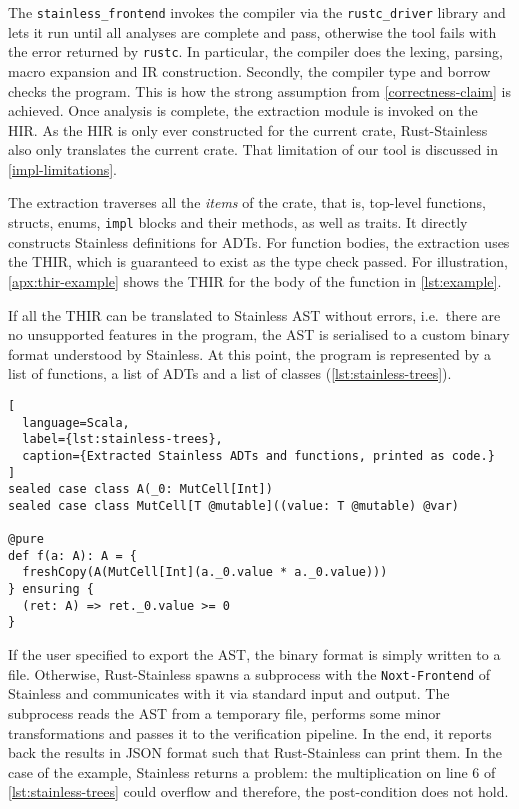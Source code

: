 The \lstinline!stainless_frontend! invokes the compiler via the
\lstinline!rustc_driver! library and lets it run until all analyses are complete
and pass, otherwise the tool fails with the error returned by \lstinline!rustc!.
In particular, the compiler does the lexing, parsing, macro expansion and IR
construction. Secondly, the compiler type and borrow checks the program. This is
how the strong assumption from \autoref{correctness-claim} is achieved. Once
analysis is complete, the extraction module is invoked on the HIR. As the HIR is
only ever constructed for the current crate, Rust-Stainless also only translates
the current crate. That limitation of our tool is discussed in
\autoref{impl-limitations}.

The extraction traverses all the \emph{items} of the crate, that is, top-level
functions, structs, enums, \lstinline!impl! blocks and their methods, as well as
traits. It directly constructs Stainless definitions for ADTs. For function
bodies, the extraction uses the THIR, which is guaranteed to exist as the type
check passed. For illustration, \autoref{apx:thir-example} shows the THIR for
the body of the function in \autoref{lst:example}.

If all the THIR can be translated to Stainless AST without errors, i.e.~there
are no unsupported features in the program, the AST is serialised to a custom
binary format understood by Stainless. At this point, the program is represented
by a list of functions, a list of ADTs and a list of classes
(\autoref{lst:stainless-trees}).

\begin{lstlisting}[
  language=Scala,
  label={lst:stainless-trees},
  caption={Extracted Stainless ADTs and functions, printed as code.}
]
sealed case class A(_0: MutCell[Int])
sealed case class MutCell[T @mutable]((value: T @mutable) @var)

@pure
def f(a: A): A = {
  freshCopy(A(MutCell[Int](a._0.value * a._0.value)))
} ensuring {
  (ret: A) => ret._0.value >= 0
}
\end{lstlisting}

If the user specified to export the AST, the binary format is simply written to
a file. Otherwise, Rust-Stainless spawns a subprocess with the
\lstinline!Noxt-Frontend! of Stainless and communicates with it via standard
input and output. The subprocess reads the AST from a temporary file, performs
some minor transformations and passes it to the verification pipeline. In the
end, it reports back the results in JSON format such that Rust-Stainless can
print them. In the case of the example, Stainless returns a problem: the
multiplication on line 6 of \autoref{lst:stainless-trees} could overflow and
therefore, the post-condition does not hold.



